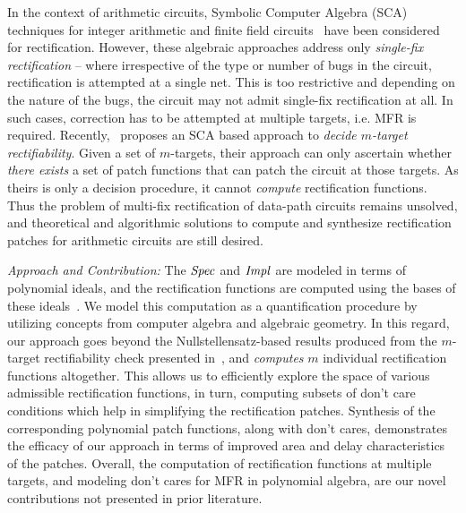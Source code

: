 In the context of arithmetic circuits, Symbolic Computer Algebra (SCA) 
techniques for integer arithmetic \cite{farimah:2017:1,MF_Rolf:ISVLSI18} and
finite field circuits~\cite{Utkarsh:VLSI18,Vkrao:FMCAD18}
have been considered for rectification. However, these algebraic
approaches address only {\it single-fix rectification} -- where
irrespective of the type or number of bugs in the circuit,
rectification is attempted at a single net. This is too restrictive
and depending on the nature of the bugs, the circuit may not admit
single-fix rectification at all. In such cases,  correction has to be
attempted at multiple targets, i.e. MFR is required.
Recently,~\cite{Vkrao:ISQED21} proposes an SCA based approach to 
{\it decide $m$-target rectifiability}. Given a set of $m$-targets,
their approach can only ascertain whether {\it there exists} a set of
patch functions that can patch the circuit at those targets. As 
theirs is only a decision
procedure, it cannot {\it compute} rectification functions.
Thus the problem of multi-fix rectification of data-path circuits
remains unsolved, and theoretical and algorithmic solutions to compute
and synthesize rectification patches for arithmetic circuits are still
desired. 

{\it Approach and Contribution:}
The ${\it Spec}$ and ${\it Impl}$ are modeled in terms of polynomial ideals, and
the rectification functions are computed using the \Grobner bases of these ideals~\cite{gb_book}.
We model this computation as a quantification procedure by utilizing
concepts from computer algebra and algebraic geometry. 
In this regard, our approach goes beyond
the Nullstellensatz-based results produced from the $m$-target
rectifiability check presented in~\cite{Vkrao:ISQED21}, and {\it computes}
$m$ individual rectification functions altogether. This allows us to
efficiently explore the space of various admissible rectification
functions, in turn, computing subsets of don't care conditions
which help in simplifying the rectification patches. Synthesis of the 
corresponding polynomial patch functions, along with don't cares,  
demonstrates the efficacy of our approach in terms of improved area 
and delay characteristics of the patches.
Overall, the computation of rectification functions at multiple
targets, and modeling don't cares for MFR in
polynomial algebra, are our novel contributions not presented
in prior literature. 


